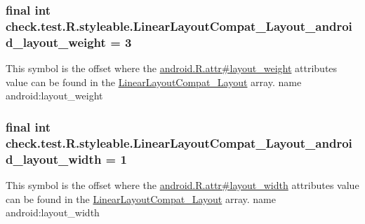 \subsubsection[{Linear\+Layout\+Compat\+\_\+\+Layout\+\_\+android\+\_\+layout\+\_\+weight}]{\setlength{\rightskip}{0pt plus 5cm}final int check.\+test.\+R.\+styleable.\+Linear\+Layout\+Compat\+\_\+\+Layout\+\_\+android\+\_\+layout\+\_\+weight = 3\hspace{0.3cm}{\ttfamily [static]}}\label{classcheck_1_1test_1_1_r_1_1styleable_a299ea2d69f5676bd2a0f96a6d99a9be2}
This symbol is the offset where the \hyperlink{}{android.\+R.\+attr\#layout\+\_\+weight} attribute\textquotesingle{}s value can be found in the \hyperlink{classcheck_1_1test_1_1_r_1_1styleable_a06b8cec0701fce506df2a245c8c71b9d}{Linear\+Layout\+Compat\+\_\+\+Layout} array.  name android\+:layout\+\_\+weight \hypertarget{classcheck_1_1test_1_1_r_1_1styleable_a66569db7d0c170d5da67560afcc12a87}{}
\subsubsection[{Linear\+Layout\+Compat\+\_\+\+Layout\+\_\+android\+\_\+layout\+\_\+width}]{\setlength{\rightskip}{0pt plus 5cm}final int check.\+test.\+R.\+styleable.\+Linear\+Layout\+Compat\+\_\+\+Layout\+\_\+android\+\_\+layout\+\_\+width = 1\hspace{0.3cm}{\ttfamily [static]}}\label{classcheck_1_1test_1_1_r_1_1styleable_a66569db7d0c170d5da67560afcc12a87}
This symbol is the offset where the \hyperlink{}{android.\+R.\+attr\#layout\+\_\+width} attribute\textquotesingle{}s value can be found in the \hyperlink{classcheck_1_1test_1_1_r_1_1styleable_a06b8cec0701fce506df2a245c8c71b9d}{Linear\+Layout\+Compat\+\_\+\+Layout} array.  name android\+:layout\+\_\+width \hypertarget{classcheck_1_1test_1_1_r_1_1styleable_a68068887a622f9abc4411ad0205c6676}{}
